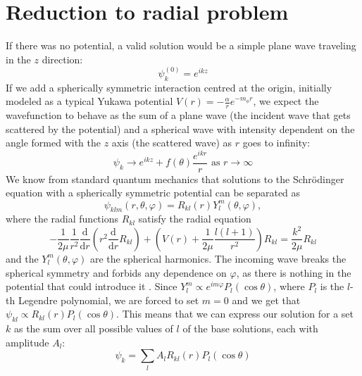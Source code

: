 \section{Reduction to radial problem}

If there was no potential, a valid solution would be a simple plane wave traveling in the \(z\) direction:
\begin{equation}
	\psi _k^{(0)} = e^{ikz} 
\end{equation}
If we add a spherically symmetric interaction centred at the origin, initially modeled as a typical Yukawa potential \(V(r) =- \frac{\alpha}{r} e^{-m_{\phi } r }\), we expect the wavefunction to behave as the sum of a plane wave (the incident wave that gets scattered by the potential) and a spherical wave with intensity dependent on the angle formed with the \(z\) axis (the scattered wave) as \(r\) goes to infinity:
\begin{equation}\label{deriv:asymptotic}
	\psi _k \to e^{ikz} + f(\theta ) \frac{e^{ikr} }{r} \text{ as } r\to \infty 
\end{equation}
We know from standard quantum mechanics that solutions to the Schrödinger equation with a spherically symmetric potential can be separated as
\begin{equation}
	\psi_{klm} (r,\theta,\varphi) = R_{kl} (r) Y_l^m(\theta , \varphi ),
\end{equation}
where the radial functions \(R_{kl} \) satisfy the radial equation
\begin{equation}\label{deriv:radial}
	-\frac{1}{2\mu } \frac{1}{r^2} \frac{\mathrm{d}}{\mathrm{d}r}\left(r^2 \frac{\mathrm{d}}{\mathrm{d}r}  R_{kl}\right) + \left(V(r)+ \frac{1}{2\mu }\frac{l(l+1)}{r^2}\right)R_{kl} = \frac{k^2}{2\mu }R_{kl} 
\end{equation}
and the \(Y_l^m(\theta , \varphi )\) are the spherical harmonics. The incoming wave breaks the spherical symmetry and forbids any dependence on \(\varphi \), as there is nothing in the potential that could introduce it \cite{Griffiths}. Since \(Y_l^m \propto e^{im \varphi} P_l(\cos \theta ) \), where \(P_l\) is the \(l\)-th Legendre polynomial, we are forced to set \(m=0\) and we get that \(\psi_{kl} \propto R_{kl}(r) P_l (\cos \theta )\). This means that we can express our solution for a set \(k\) as the sum over all possible values of \(l\) of the base solutions, each with amplitude \(A_l\):
\begin{equation}\label{deriv:sum}
	\psi _k = \sum_{l} A_l R_{kl} (r) P_l (\cos \theta )
\end{equation}

